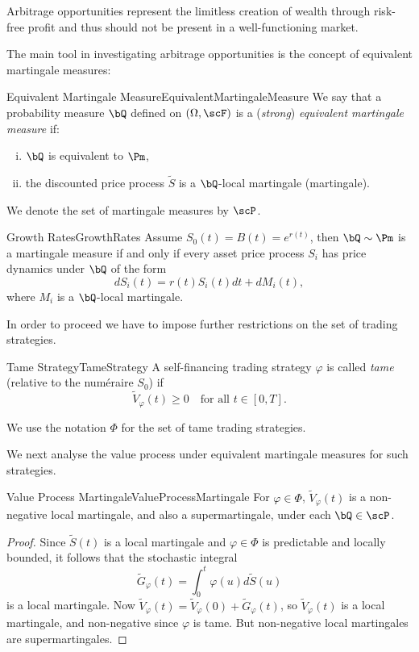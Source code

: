 Arbitrage opportunities represent the limitless creation of wealth through
risk-free profit and thus should not be present in a well-functioning market.

The main tool in investigating arbitrage opportunities is the concept of
equivalent martingale measures:

\begin{defn}{Equivalent Martingale Measure}{EquivalentMartingaleMeasure}
	We say that a probability measure $\bQ$ defined on $(\Omega, \scF)$ is a (\textit{strong}) \textit{equivalent martingale measure} if:
	\begin{enumerate}[(i)]
		\item $\bQ$ is equivalent to $\Pm$,
		\item the discounted price process $\tilde{S}$ is a $\bQ$-local martingale (martingale).
	\end{enumerate}
	We denote the set of martingale measures by $\scP$.
\end{defn}

\begin{lem}{Growth Rates}{GrowthRates}
	Assume $S_0(t) = B(t) = e^{r(t)}$, then $\bQ \sim \Pm$ is a martingale measure if and only if every asset price process $S_i$ has price dynamics under $\bQ$ of the form
	\[
		dS_i(t) = r(t)S_i(t)dt + dM_i(t),
	\]
	where $M_i$ is a $\bQ$-local martingale.
\end{lem}

In order to proceed we have to impose further restrictions on the set of trading strategies.

\begin{defn}{Tame Strategy}{TameStrategy}
	A self-financing trading strategy $\varphi$ is called \textit{tame} (relative to the num\'{e}raire $S_0$) if
	\[
		\tilde{V}_{\varphi}(t) \ge 0 \quad \text{for all } t \in [0, T].
	\]

	We use the notation $\Phi$ for the set of tame trading strategies.
\end{defn}

We next analyse the value process under equivalent martingale measures for such strategies.

\begin{prop}{Value Process Martingale}{ValueProcessMartingale}
	For \(\varphi \in \Phi\), \(\tilde{V}_{\varphi}(t)\) is a non-negative local martingale, and also a supermartingale, under each \(\bQ \in \scP\).
\end{prop}

\begin{proof}
	Since $\tilde{S}(t)$ is a local martingale and $\varphi \in \Phi$ is predictable and locally bounded, it follows that the stochastic integral
	\[
		\tilde{G}_{\varphi}(t) = \int_0^t \varphi(u)d\tilde{S}(u)
	\]
	is a local martingale. Now $\tilde{V}_{\varphi}(t) = \tilde{V}_{\varphi}(0) + \tilde{G}_{\varphi}(t)$, so $\tilde{V}_{\varphi}(t)$ is a local martingale, and non-negative since $\varphi$ is tame. But non-negative local martingales are supermartingales.
\end{proof}

